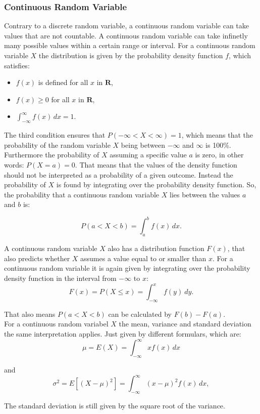 \subsubsection{Continuous Random Variable}
Contrary to a discrete random variable, a continuous random variable can take values that are not countable. A continuous random variable can take infinetly many possible values within a certain range or interval. For a continuous random variable $X$ the distribution is given by the probability density function $f$, which satisfies:

\begin{itemize}
	\item $f(x)$ is defined for all $x$ in $\textbf{R}$,
	\item $f(x) \geq 0$ for all $x$ in $\textbf{R}$,
	\item $\int_{-\infty}^{\infty} f(x) \, dx = 1.$
\end{itemize}

\noindent The third condition ensures that $P(-\infty < X < \infty) = 1$, which means that the probability of the random variable $X$ being between $-\infty$ and $\infty$ is 100\%. Furthermore the probability of $X$ assuming a specific value $a$ is zero, in other words: $P(X=a)=0$. That means that the values of the density function should not be interpreted as a probability of a given outcome. Instead the probability of $X$ is found by integrating over the probability density function. So, the probability that a continuous random variable $X$ lies between the values $a$ and $b$ is: 

\begin{equation}
P(a < X < b) = \int_a^b f(x) \, dx.
\end{equation}


\noindent A continuous random variable $X$ also has a distribution function $F(x)$, that also predicts whether $X$ assumes a value equal to or smaller than $x$. For a continuous random variable it is again given by integrating over the probability density function in the interval from $-\infty$ to $x$:
\begin{equation}
F(x) = P(X \leq x) = \int_{-\infty}^{x} f(y) \ dy.
\end{equation}


\noindent That also means $P(a<X<b)$ can be calculated by $F(b)-F(a)$.
\\

\noindent For a continuous random variabel $X$ the mean, variance and standard deviation the same interpretation applies. Just given by different formulars, which are:
\begin{equation}
	\mu = E(X) = \int_{-\infty}^{\infty} x f(x) \, dx
\end{equation}

\noindent and
\begin{equation}
\sigma^2 = E\left[(X - \mu)^2\right] = \int_{-\infty}^{\infty} (x - \mu)^2 f(x) \, dx,
\end{equation}

\noindent The standard deviation is still given by the square root of the variance.

